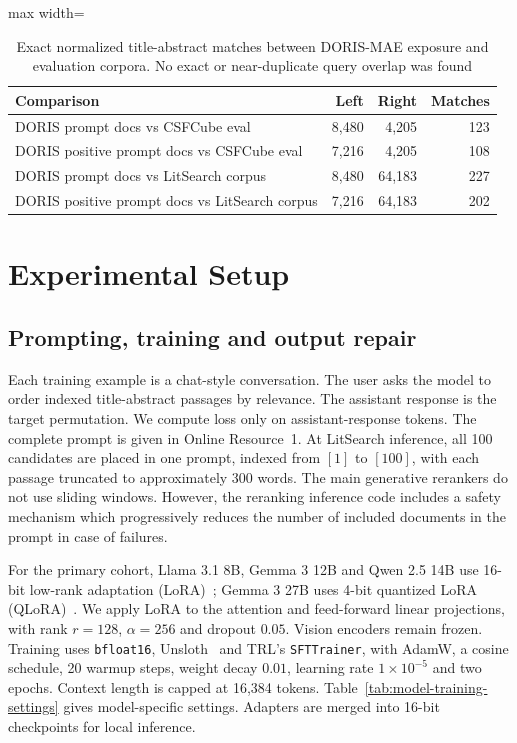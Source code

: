 \documentclass[pdflatex,sn-basic,Numbered]{sn-jnl}%
\theoremstyle{thmstyleone}%
\theoremstyle{thmstyletwo}%
\theoremstyle{thmstylethree}%
\begin{document}
\begin{table}[htbp]


\centering
\footnotesize
\setlength{\tabcolsep}{3pt}
\begin{adjustbox}{max width=\linewidth}
\begin{tabular}{p{} r r r}
\hline
Comparison & Left & Right & Matches \\
\hline
DORIS prompt docs vs CSFCube eval & 8,480 & 4,205 & 123 \\
DORIS positive prompt docs vs CSFCube eval & 7,216 & 4,205 & 108 \\
DORIS prompt docs vs LitSearch corpus & 8,480 & 64,183 & 227 \\
DORIS positive prompt docs vs LitSearch corpus & 7,216 & 64,183 & 202 \\
\hline
\end{tabular}
\end{adjustbox}


\caption{Exact normalized title-abstract matches between DORIS-MAE exposure and evaluation corpora. No exact or near-duplicate query overlap was found}
\label{tab:leakage-overlap}
\end{table}

\section{Experimental Setup}
\label{sec:setup}
\subsection{Prompting, training and output repair}
Each training example is a chat-style conversation. The user asks the model to
order indexed title-abstract passages by relevance. The assistant response is
the target permutation. We compute loss only on assistant-response tokens.
The complete prompt is given in Online Resource~1. At LitSearch inference, all
100 candidates are placed in one prompt, indexed from $[1]$ to $[100]$, with
each passage truncated to approximately 300 words. The main generative rerankers
do not use sliding windows. However, the reranking inference code includes a safety mechanism which progressively reduces the number of included documents in the prompt in case of failures.

For the primary cohort, Llama 3.1 8B, Gemma 3 12B and Qwen 2.5 14B use 16-bit
low-rank adaptation (LoRA)~\cite{Hu}; Gemma 3 27B uses 4-bit quantized LoRA (QLoRA)~\cite{Dettmers}. We apply LoRA to
the attention and feed-forward linear projections, with rank $r=128$,
$\alpha=256$ and dropout $0.05$. Vision encoders remain frozen. Training uses
\texttt{bfloat16}, Unsloth~\cite{unsloth} and TRL's \texttt{SFTTrainer}, with
AdamW, a cosine schedule, 20 warmup steps, weight decay $0.01$, learning rate
$1\times10^{-5}$ and two epochs. Context length is capped at 16,384 tokens.
Table~\ref{tab:model-training-settings} gives model-specific settings.
Adapters are merged into 16-bit checkpoints for local inference.
\end{document}
